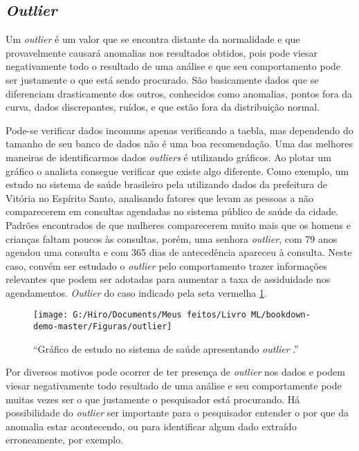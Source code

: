 \documentclass[
]{book}
\begin{document}
\hypertarget{outlier}{%
\subsection{\texorpdfstring{\emph{Outlier}}{Outlier}}\label{outlier}}

Um \emph{outlier} é um valor que se encontra distante da normalidade e que provavelmente causará anomalias nos resultados obtidos, pois pode viesar negativamente todo o resultado de uma análise e que seu comportamento pode ser justamente o que está sendo procurado. São basicamente dados que se diferenciam drasticamente dos outros, conhecidos como anomalias, pontos fora da curva, dados discrepantes, ruídos, e que estão fora da distribuição normal.

Pode-se verificar dados incomuns apenas verificando a taebla, mas dependendo do tamanho de seu banco de dados não é uma boa recomendação. Uma das melhores maneiras de identificarmos dados \emph{outliers} é utilizando gráficos. Ao plotar um gráfico o analista consegue verificar que existe algo diferente. Como exemplo, um estudo no sistema de saúde brasileiro pela \citet{aquarela} utilizando dados da prefeitura de Vitória no Espírito Santo, analisando fatores que levam as pessoas a não comparecerem em consultas agendadas no sistema público de saúde da cidade. Padrões encontrados de que mulheres comparecerem muito mais que os homens e crianças faltam poucos às consultas, porém, uma senhora \emph{outlier}, com 79 anos agendou uma consulta e com 365 dias de antecedência apareceu à consulta. Neste caso, convém ser estudado o \emph{outlier} pelo comportamento trazer informações relevantes que podem ser adotadas para aumentar a taxa de assiduidade nos agendamentos. \emph{Outlier} do caso indicado pela seta vermelha \ref{fig:outlier}.

\begin{figure}

{\centering \texttt{[image: G:/Hiro/Documents/Meus feitos/Livro ML/bookdown-demo-master/Figuras/outlier]} 

}

\caption{``Gráfico de estudo no sistema de saúde apresentando \emph{outlier} \citep{aquarela}.''}\label{fig:outlier}
\end{figure}



Por diversos motivos pode ocorrer de ter presença de \emph{outlier} nos dados e podem viesar negativamente todo resultado de uma análise e seu comportamente pode muitas vezes ser o que justamente o pesquisador está procurando. Há possibilidade do \emph{outlier} ser importante para o pesquisador entender o por que da anomalia estar acontecendo, ou para identificar algum dado extraído erroneamente, por exemplo.
\end{document}
